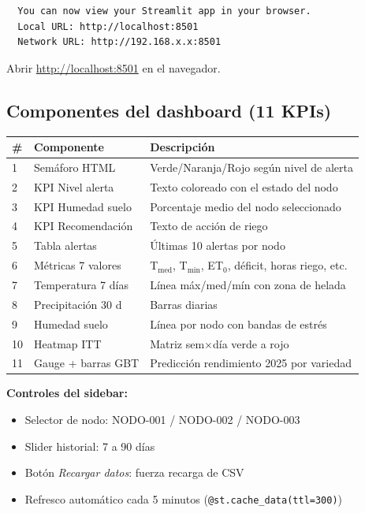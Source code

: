 \documentclass[11pt,a4paper]{article}
\begin{document}
\begin{okbox}
\begin{lstlisting}
  You can now view your Streamlit app in your browser.
  Local URL: http://localhost:8501
  Network URL: http://192.168.x.x:8501
\end{lstlisting}
Abrir \href{http://localhost:8501}{http://localhost:8501} en el navegador.
\end{okbox}

\subsection{Componentes del dashboard (11 KPIs)}

\begin{tabular}{llp{6cm}}
\toprule
\# & Componente & Descripci\'on \\
\midrule
1 & Sem\'aforo HTML & Verde/Naranja/Rojo seg\'un nivel de alerta \\
2 & KPI Nivel alerta & Texto coloreado con el estado del nodo \\
3 & KPI Humedad suelo & Porcentaje medio del nodo seleccionado \\
4 & KPI Recomendaci\'on & Texto de acci\'on de riego \\
5 & Tabla alertas & \'Ultimas 10 alertas por nodo \\
6 & M\'etricas 7 valores & T$_{\text{med}}$, T$_{\min}$, ET$_0$, d\'eficit, horas riego, etc. \\
7 & Temperatura 7 d\'ias & L\'inea m\'ax/med/m\'in con zona de helada \\
8 & Precipitaci\'on 30 d & Barras diarias \\
9 & Humedad suelo & L\'inea por nodo con bandas de estr\'es \\
10 & Heatmap ITT & Matriz sem$\times$d\'ia verde a rojo \\
11 & Gauge + barras GBT & Predicci\'on rendimiento 2025 por variedad \\
\bottomrule
\end{tabular}

\vspace{0.5em}
\textbf{Controles del sidebar:}
\begin{itemize}
  \item Selector de nodo: NODO-001 / NODO-002 / NODO-003
  \item Slider historial: 7 a 90 d\'ias
  \item Bot\'on \textit{Recargar datos}: fuerza recarga de CSV
  \item Refresco autom\'atico cada 5 minutos (\texttt{@st.cache\_data(ttl=300)})
\end{itemize}
\end{document}
